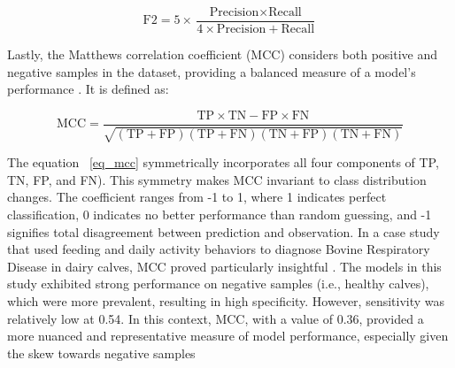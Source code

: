\begin{equation} \label{eq_f2}
    \text{F2} = 5 \times \frac{\text{Precision} \times \text{Recall}}{4 \times \text{Precision} + \text{Recall}}
\end{equation}

Lastly, the Matthews correlation coefficient (MCC) considers both positive and negative samples in the dataset, providing a balanced measure of a model's performance \citep{chicco_advantages_2020}. It is defined as:

\begin{equation} \label{eq_mcc}
    \text{MCC} = \frac{\text{TP} \times \text{TN} - \text{FP} \times \text{FN}}{\sqrt{(\text{TP} + \text{FP})(\text{TP} + \text{FN})(\text{TN} + \text{FP})(\text{TN} + \text{FN})}}
\end{equation}

The equation ~\ref{eq_mcc} symmetrically incorporates all four components of TP, TN, FP, and FN). This symmetry makes MCC invariant to class distribution changes. The coefficient ranges from -1 to 1, where 1 indicates perfect classification, 0 indicates no better performance than random guessing, and -1 signifies total disagreement between prediction and observation. In a case study that used feeding and daily activity behaviors to diagnose Bovine Respiratory Disease in dairy calves, MCC proved particularly insightful \citep{bowen_early_2021}. The models in this study exhibited strong performance on negative samples (i.e., healthy calves), which were more prevalent, resulting in high specificity. However, sensitivity was relatively low at 0.54. In this context, MCC, with a value of 0.36, provided a more nuanced and representative measure of model performance, especially given the skew towards negative samples
